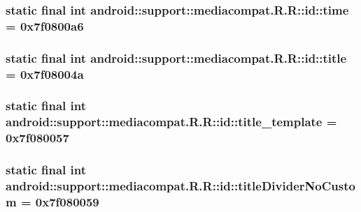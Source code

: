 \hypertarget{classandroid_1_1support_1_1mediacompat_1_1_r_1_1id_960bd9132858fa28e2c733f8862c5a50}{
\subsubsection[{time}]{\setlength{\rightskip}{0pt plus 5cm}static final int android::support::mediacompat.R.R::id::time = 0x7f0800a6}}
\label{classandroid_1_1support_1_1mediacompat_1_1_r_1_1id_960bd9132858fa28e2c733f8862c5a50}


\hypertarget{classandroid_1_1support_1_1mediacompat_1_1_r_1_1id_37f924bcff06c757deeda7149b0c2a63}{
\subsubsection[{title}]{\setlength{\rightskip}{0pt plus 5cm}static final int android::support::mediacompat.R.R::id::title = 0x7f08004a}}
\label{classandroid_1_1support_1_1mediacompat_1_1_r_1_1id_37f924bcff06c757deeda7149b0c2a63}


\hypertarget{classandroid_1_1support_1_1mediacompat_1_1_r_1_1id_06e07690fbea73fa2c3867f30f872b60}{
\subsubsection[{title\_\-template}]{\setlength{\rightskip}{0pt plus 5cm}static final int android::support::mediacompat.R.R::id::title\_\-template = 0x7f080057}}
\label{classandroid_1_1support_1_1mediacompat_1_1_r_1_1id_06e07690fbea73fa2c3867f30f872b60}


\hypertarget{classandroid_1_1support_1_1mediacompat_1_1_r_1_1id_1339fbf247e2e6912fcfd012b255c8dd}{
\subsubsection[{titleDividerNoCustom}]{\setlength{\rightskip}{0pt plus 5cm}static final int android::support::mediacompat.R.R::id::titleDividerNoCustom = 0x7f080059}}
\label{classandroid_1_1support_1_1mediacompat_1_1_r_1_1id_1339fbf247e2e6912fcfd012b255c8dd}


